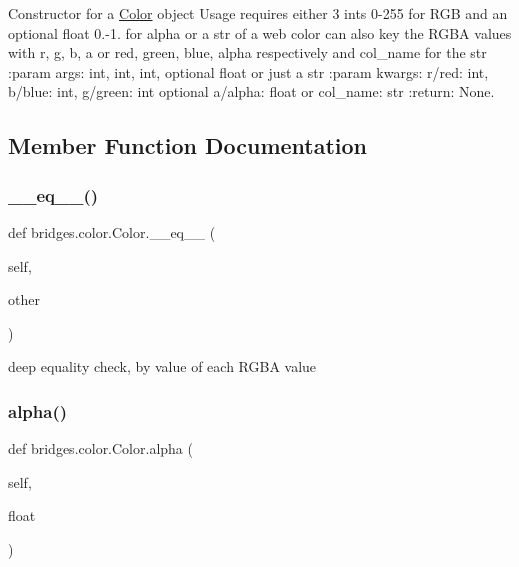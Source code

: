 Constructor for a \hyperlink{classbridges_1_1color_1_1_color}{Color} object Usage requires either 3 ints 0-\/255 for R\+GB and an optional float 0.-\/1. for alpha or a str of a web color can also key the R\+G\+BA values with r, g, b, a or red, green, blue, alpha respectively and col\+\_\+name for the str \+:param args\+: int, int, int, optional float or just a str \+:param kwargs\+: r/red\+: int, b/blue\+: int, g/green\+: int optional a/alpha\+: float or col\+\_\+name\+: str \+:return\+: None. 



\subsection{Member Function Documentation}
\mbox{\label{classbridges_1_1color_1_1_color_ae5677a0858252f0b33da13866fb62786}} 
\subsubsection{\texorpdfstring{\+\_\+\+\_\+eq\+\_\+\+\_\+()}{\_\_eq\_\_()}}
{\footnotesize\ttfamily def bridges.\+color.\+Color.\+\_\+\+\_\+eq\+\_\+\+\_\+ (\begin{DoxyParamCaption}\item[{}]{self,  }\item[{}]{other }\end{DoxyParamCaption})}



deep equality check, by value of each R\+G\+BA value 

\mbox{\label{classbridges_1_1color_1_1_color_ae5dc631fcda27156867b21109620ae21}} 
\subsubsection{\texorpdfstring{alpha()}{alpha()}\hspace{0.1cm}{\footnotesize\ttfamily [1/2]}}
{\footnotesize\ttfamily def bridges.\+color.\+Color.\+alpha (\begin{DoxyParamCaption}\item[{}]{self,  }\item[{}]{float }\end{DoxyParamCaption})}




